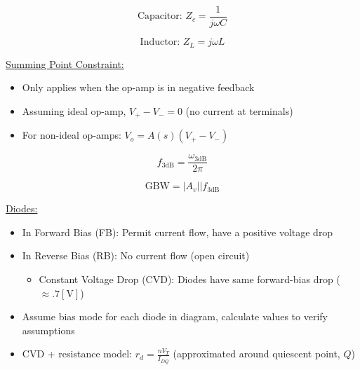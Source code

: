 \documentclass[12pt]{article}
\begin{document}
  \begin{multicols}{2}

    \begin{equation*}
      \text{Capacitor: }Z_c=\frac{1}{j\omega C}
    \end{equation*}

    \begin{equation*}
      \text{Inductor: }Z_L=j\omega L
    \end{equation*}

  \end{multicols}

  \begin{center}
    \underline{Summing Point Constraint: }
  \end{center}
  \begin{itemize}
    \item Only applies when the op-amp is in negative feedback
    \item Assuming ideal op-amp, $V_+-V_-=0$ (no current at terminals)
    \item For non-ideal op-amps: $V_o=A(s)(V_+-V_-)$
  \end{itemize}

  \vspace{-25pt}

  \begin{multicols}{2}

    \begin{equation*}
      f_{3\text{dB}}=\frac{\omega_{3\text{dB}}}{2\pi}
    \end{equation*}

    \begin{equation*}
      \text{GBW}=|A_v||f_{3\text{dB}}
    \end{equation*}

  \end{multicols}

  \begin{center}
    \underline{Diodes:}
  \end{center}
  \begin{itemize}

    \item In Forward Bias (FB): Permit current flow, have a positive voltage drop

    \item In Reverse Bias (RB): No current flow (open circuit)

      \begin{itemize}

        \item Constant Voltage Drop (CVD): Diodes have same forward-bias drop ($\approx.7[\si{\volt}]$)

      \end{itemize}

    \item Assume bias mode for each diode in diagram, calculate values to verify assumptions

    \item CVD + resistance model: $r_d=\frac{nV_T}{I_{DQ}}$ (approximated around quiescent point, $Q$)

  \end{itemize}
\end{document}
